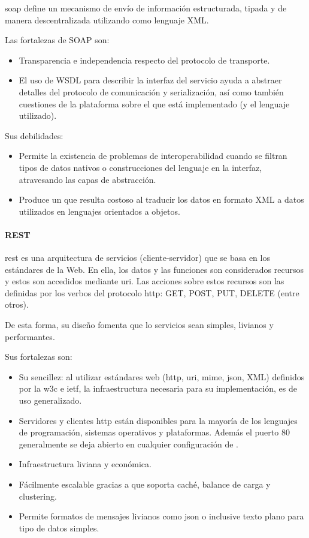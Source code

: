 \gls{soap} define un mecanismo de envío de información estructurada, tipada y de manera descentralizada utilizando como lenguaje \gls{XML}\cite{box2000simple}.


Las fortalezas de SOAP\cite{pautasso2008restful} son:
\begin{itemize}
\item Transparencia e independencia respecto del protocolo de transporte.
\item El uso de \gls{WSDL} para describir la interfaz del servicio ayuda a abstraer detalles del protocolo de comunicación y serialización, así como también cuestiones de la plataforma sobre el que está implementado (y el lenguaje utilizado).
\end{itemize}
Sus debilidades:
\begin{itemize}
\item Permite la existencia de problemas de interoperabilidad cuando se filtran tipos de datos nativos o construcciones del lenguaje en la interfaz, atravesando las capas de abstracción.
\item Produce un  que resulta costoso al traducir los datos en formato \gls{XML} a datos utilizados en lenguajes orientados a objetos.
\end{itemize}

\paragraph{REST}
\label{rest}

\gls{rest}\cite{fielding2000rest} es una arquitectura de servicios (cliente-servidor) que se basa en los estándares de la Web. En ella, los datos y las funciones son considerados recursos y estos son accedidos mediante \gls{uri}. Las acciones sobre estos recursos son las definidas por los verbos del protocolo \gls{http}: GET, POST, PUT, DELETE (entre otros).

De esta forma, su diseño fomenta que lo servicios sean simples, livianos y performantes.

Sus fortalezas son\cite{pautasso2008restful}:
\begin{itemize}
\item Su sencillez: al utilizar estándares web (\gls{http}, \gls{uri}, \gls{mime}, \gls{json}, \gls{XML}) definidos por la \gls{w3c} e \gls{ietf}, la infraestructura necesaria para su implementación, es de uso generalizado.
\item Servidores y clientes \gls{http} están disponibles para la mayoría de los lenguajes de programación, sistemas operativos y plataformas. Además el puerto 80 generalmente se deja abierto en cualquier configuración de .
\item Infraestructura liviana y económica.
\item Fácilmente escalable gracias a que soporta caché, balance de carga y \gls{clustering}.
\item Permite formatos de mensajes livianos como \gls{json} o inclusive texto plano para tipo de datos simples.
\end{itemize}

